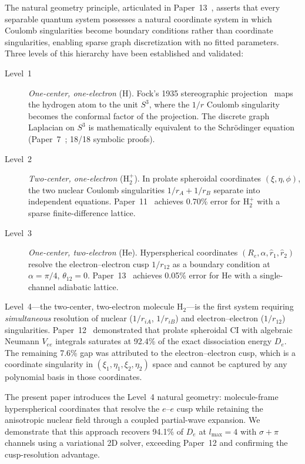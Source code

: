 \documentclass[aps,pra,twocolumn,superscriptaddress,longbibliography]{revtex4-2}
\begin{document}
The natural geometry principle, articulated in Paper~13~\cite{paper13},
asserts that every separable quantum system possesses a natural
coordinate system in which Coulomb singularities become boundary
conditions rather than coordinate singularities, enabling sparse graph
discretization with no fitted parameters.
Three levels of this hierarchy have been established and validated:

\begin{description}
\item[Level~1] \emph{One-center, one-electron} (H).  Fock's 1935
  stereographic projection~\cite{fock1935} maps the hydrogen atom to the
  unit $S^3$, where the $1/r$ Coulomb singularity becomes the conformal
  factor of the projection.  The discrete graph Laplacian on $S^3$ is
  mathematically equivalent to the Schr\"odinger equation
  (Paper~7~\cite{paper7}; 18/18 symbolic proofs).
\item[Level~2] \emph{Two-center, one-electron} (H$_2^+$).  In prolate
  spheroidal coordinates $(\xi,\eta,\phi)$, the two nuclear Coulomb
  singularities $1/r_A + 1/r_B$ separate into independent equations.
  Paper~11~\cite{paper11} achieves 0.70\% error for H$_2^+$ with a
  sparse finite-difference lattice.
\item[Level~3] \emph{One-center, two-electron} (He).  Hyperspherical
  coordinates $(R_e,\alpha,\hat r_1,\hat r_2)$ resolve the
  electron--electron cusp $1/r_{12}$ as a boundary condition at
  $\alpha=\pi/4$, $\theta_{12}=0$.  Paper~13~\cite{paper13} achieves
  0.05\% error for He with a single-channel adiabatic lattice.
\end{description}

Level~4---the two-center, two-electron molecule H$_2$---is the first
system requiring \emph{simultaneous} resolution of nuclear ($1/r_{iA}$,
$1/r_{iB}$) and electron--electron ($1/r_{12}$) singularities.
Paper~12~\cite{paper12} demonstrated that prolate spheroidal CI with
algebraic Neumann $V_{ee}$ integrals saturates at 92.4\% of the exact
dissociation energy $D_e$.  The remaining 7.6\% gap was attributed to the
electron--electron cusp, which is a coordinate singularity in
$(\xi_1,\eta_1,\xi_2,\eta_2)$ space and cannot be captured by any
polynomial basis in those coordinates.

The present paper introduces the Level~4 natural geometry: molecule-frame
hyperspherical coordinates that resolve the $e$--$e$ cusp while retaining
the anisotropic nuclear field through a coupled partial-wave expansion.
We demonstrate that this approach recovers 94.1\% of $D_e$ at
$l_{\max}=4$ with $\sigma{+}\pi$ channels using a variational 2D solver,
exceeding Paper~12 and confirming the cusp-resolution advantage.
\end{document}
